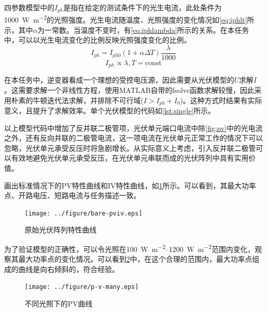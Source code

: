 \documentclass[a4paper,12pt]{article}
\begin{document}
    四参数模型中的$I_{ph}$是指在给定的测试条件下的光生电流，此处条件为\SI{1000}{\W\per\meter\squared}的光照强度。光生电流随温度、光照强度的变化情况如\cref{eq:iphlt}所示，其中$\alpha$为一常数。当温度不变时，有\cref{eq:iphlambda}所示的关系。在本任务中，可以以光生电流变化的比例反映光照强度变化的比例。
    \begin{equation}
        I_{ph}=I_{ph0}\left(1+\alpha \Delta T\right)\frac{\lambda}{1000}
        \label{eq:iphlt}
    \end{equation}
    \begin{equation}
        I_{ph} \propto \lambda, T=\text{const}
        \label{eq:iphlambda}
    \end{equation}

    在本任务中，逆变器看成一个理想的受控电压源，因此需要从光伏模型的$U$求解$I$。这需要求解一个非线性方程，使用MATLAB自带的fsolve函数求解较慢，因此采用朴素的牛顿迭代法求解，并排除不可行域($I>I_{ph}+I_0$)。这种方式时结果有实际意义，且提升了求解效率。单个光伏模型的代码如\cref{lst:single}所示。
    

    以上模型代码中增加了反并联二极管项，光伏单元端口电流中除\cref{fig:pv}中的光电流之外，还有反向并联的二极管电流，这一项电流在光伏单元正常工作的情况下可以忽略，光伏单元承受反压时将急剧增长。从实际意义上考虑，引入反并联二极管可以有效地避免光伏单元承受反压，在光伏单元串联而成的光伏阵列中具有实用价值。

    画出标准情况下的PV特性曲线和IV特性曲线，如\cref{fig:bare-pviv}所示。可以看到，其最大功率点、开路电压、短路电流与任务描述一致。
    \begin{figure}[htbp]
        \centering
        \texttt{[image: ../figure/bare-pviv.eps]}
        \caption{原始光伏阵列特性曲线}
        \label{fig:bare-pviv}
    \end{figure}

    为了验证模型的正确性，可以令光照在\SIrange{100}{1200}{\W\per\meter\squared}范围内变化，观察其最大功率点的变化情况。可以看到\cref{fig:p-v-many}中，在这个合理的范围内，最大功率点组成的曲线是向右倾斜的，符合经验。
    \begin{figure}[htbp]
        \centering
        \texttt{[image: ../figure/p-v-many.eps]}
        \caption{不同光照下的PV曲线}
        \label{fig:p-v-many}
    \end{figure}
\end{document}
